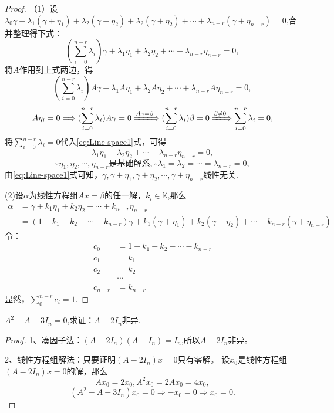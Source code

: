 \begin{proof}

  （1）设\(\lambda_0\gamma+\lambda_1(\gamma+\eta_1)+\lambda_2(\gamma+\eta_2)+
  \lambda_2(\gamma+\eta_2)+\cdots+\lambda_{n-r}(\gamma+\eta_{n-r})=0\),合并整理得下式：
  \begin{equation}\label{eq:Line-space1}
    (\sum_{i=0}^{n-r}\lambda_i)\gamma+\lambda_1\eta_1+
    \lambda_2\eta_2+\cdots+\lambda_{n-r}\eta_{n-r}=0,
  \end{equation}
  将\(A\)作用到上式两边，得
  \[
    (\sum_{i=0}^{n-r}\lambda_i)A\gamma+\lambda_1A\eta_1+\lambda_2A\eta_2+
    \cdots+\lambda_{n-r}A\eta_{n-r}=0,
  \]
  \[
    A\eta_i=0 \Longrightarrow (\displaystyle\sum_{i=0}^{n-r}\lambda_i)A\gamma=0
  \xLongrightarrow{A\gamma=\beta}(\displaystyle\sum_{i=0}^{n-r}\lambda_i)\beta=0
  \xLongrightarrow{\beta \neq 0}\displaystyle\sum_{i=0}^{n-r}\lambda_i=0,
\]
  将\(\displaystyle\sum_{i=0}^{n-r}\lambda_i=0\)代入\eqref{eq:Line-space1}式，可得
  \[
    \lambda_1\eta_1+\lambda_2\eta_2+\cdots+\lambda_{n-r}\eta_{n-r}=0,
  \]
  \[
    \because \eta_1,\eta_2,\cdots,\eta_{n-r}\text{是基础解系},
    \therefore \lambda_1=\lambda_2=\cdots=\lambda_{n-r}=0,
  \]
  由\eqref{eq:Line-space1}式可知，\(\gamma,\gamma+\eta_1,\gamma+\eta_2,\cdots,
  \gamma+\eta_{n-r}\)线性无关.

  (2)设\(\alpha\)为线性方程组\(Ax=\beta\)的任一解，\(k_i \in \mathbb{K}\),那么
  \begin{align*}
    \alpha & = \gamma+k_1\eta_1+k_2\eta_2+\cdots+k_{n-r}\eta_{n-r}\\
           & = (1-k_1-k_2-\cdots-k_{n-r})\gamma+k_1(\gamma+\eta_1)+k_2(\gamma+\eta_2)+\cdots+k_{n-r}(\gamma+\eta_{n-r})
  \end{align*}
  令：
  \begin{align*}
    c_0 & = 1-k_1-k_2-\cdots-k_{n-r} \\
    c_1 & = k_1\\
    c_2 & = k_2\\
    & \cdots\\
    c_{n-r}& = k_{n-r}
  \end{align*}
  显然，\(\displaystyle\sum_0^{n-r}c_i=1\).
\end{proof}

\begin{example}
  \(A^2-A-3I_n=0\),求证：\(A-2I_n\)非异.
\end{example}

\begin{proof}

  1、凑因子法：\((A-2I_n)(A+I_n)=I_n\),所以\(A-2I_n\)非异。

  2、线性方程组解法：只要证明\((A-2I_n)x=0\)只有零解。
  设\(x_0\)是线性方程组\((A-2I_n)x=0\)的解，那么
  \[
    Ax_0=2x_0, A^2x_0=2Ax_0=4x_0,
  \]
  \[
    (A^2-A-3I_n)x_0=0\Longrightarrow -x_0=0 \Longrightarrow x_0=0.
  \]
\end{proof}

